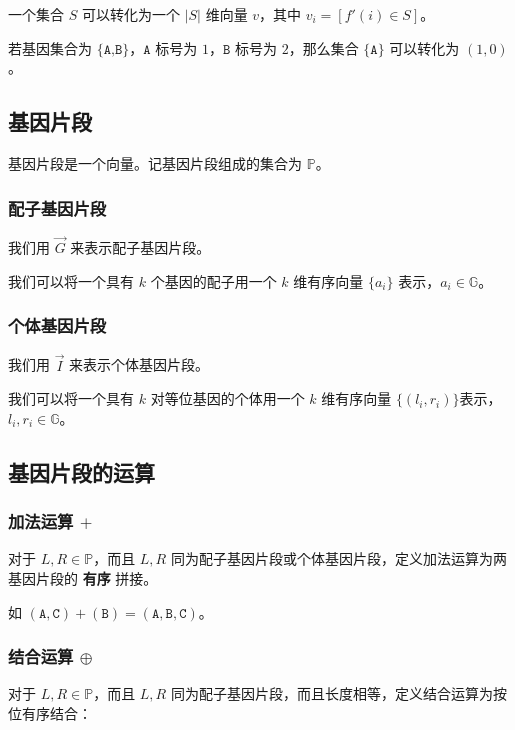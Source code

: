 \documentclass{article}
\begin{document}
	一个集合 $S$ 可以转化为一个 $|S|$ 维向量 $v$，其中 $v_i=[f'(i) \in S]$。

	若基因集合为 $\{\texttt{A,B}\}$，$\texttt{A}$ 标号为 $1$，$\texttt{B}$ 标号为 $2$，那么集合 $\{\texttt{A}\}$ 可以转化为 $(1,0)$。

	\subsection{基因片段}

	基因片段是一个向量。记基因片段组成的集合为 $\mathbb{P}$。

	\subsubsection{配子基因片段}
	
	我们用 $\vec G$ 来表示配子基因片段。

	我们可以将一个具有 $k$ 个基因的配子用一个 $k$ 维有序向量 $\{a_i\}$ 表示，$a_i \in \mathbb{G}$。

	\subsubsection{个体基因片段}

	我们用 $\vec I$ 来表示个体基因片段。

	我们可以将一个具有 $k$ 对等位基因的个体用一个 $k$ 维有序向量 $\{(l_i,r_i)\}$表示，$l_i,r_i \in \mathbb{G}$。

	\subsection{基因片段的运算}

	\subsubsection{加法运算 $+$}

	对于 $L,R \in \mathbb{P}$，而且 $L,R$ 同为配子基因片段或个体基因片段，定义加法运算为两基因片段的 \textbf{有序} 拼接。

	如 $(\texttt{A},\texttt{C}) + (\texttt{B}) = (\texttt{A},\texttt{B},\texttt{C})$。

	\subsubsection{结合运算 $\oplus$}

	对于 $L,R \in \mathbb{P}$，而且 $L,R$ 同为配子基因片段，而且长度相等，定义结合运算为按位有序结合：
\end{document}
